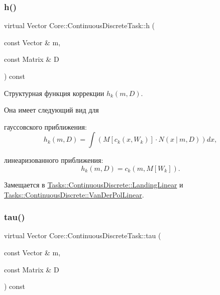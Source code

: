 \hypertarget{class_core_1_1_continuous_discrete_task_a25e88b71eb477d99bad66a66c982af6f}{}\label{class_core_1_1_continuous_discrete_task_a25e88b71eb477d99bad66a66c982af6f} 
\subsubsection{\texorpdfstring{h()}{h()}}
{\footnotesize\ttfamily virtual Vector Core\+::\+Continuous\+Discrete\+Task\+::h (\begin{DoxyParamCaption}\item[{const Vector \&}]{m,  }\item[{const Matrix \&}]{D }\end{DoxyParamCaption}) const\hspace{0.3cm}{\ttfamily [pure virtual]}}



Структурная функция коррекции $h_k(m, D)$. 

Она имеет следующий вид для


\begin{DoxyItemize}
\item гауссовского приближения\+: \[h_k(m, D) = \int (M[c_k(x, W_k)] \cdot N(x\ |\ m, D))dx,\]
\item линеаризованного приближения\+: \[h_k(m, D) = c_k(m, M[W_k]).\] 
\end{DoxyItemize}

Замещается в \hyperlink{class_tasks_1_1_continuous_discrete_1_1_landing_linear_a66480881fd719faddafe5104b548db78}{Tasks\+::\+Continuous\+Discrete\+::\+Landing\+Linear} и \hyperlink{class_tasks_1_1_continuous_discrete_1_1_van_der_pol_linear_a2a3ca4ebc2e8c458fbea40e854f375ec}{Tasks\+::\+Continuous\+Discrete\+::\+Van\+Der\+Pol\+Linear}.

\hypertarget{class_core_1_1_continuous_discrete_task_a491a9dc4463031a6f5f2eeda24d8ba9c}{}\label{class_core_1_1_continuous_discrete_task_a491a9dc4463031a6f5f2eeda24d8ba9c} 
\subsubsection{\texorpdfstring{tau()}{tau()}}
{\footnotesize\ttfamily virtual Vector Core\+::\+Continuous\+Discrete\+Task\+::tau (\begin{DoxyParamCaption}\item[{const Vector \&}]{m,  }\item[{const Matrix \&}]{D }\end{DoxyParamCaption}) const\hspace{0.3cm}{\ttfamily [pure virtual]}}



